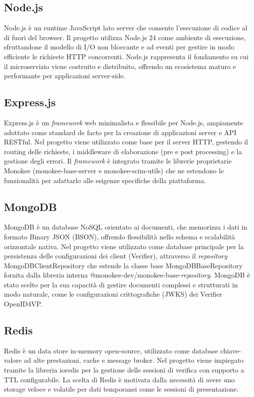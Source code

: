 \subsection{Node.js}

Node.js è un runtime JavaScript lato server che consente l'esecuzione di codice al di fuori del browser. Il progetto utilizza Node.js 24 come ambiente di esecuzione, sfruttandone il modello di I/O non bloccante e ad eventi per gestire in modo efficiente le richieste HTTP\glsfirstoccur{} concorrenti. Node.js rappresenta il fondamento su cui il microservizio viene costruito e distribuito, offrendo un ecosistema maturo e performante per applicazioni server-side.

\subsection{Express.js}
Express.js è un \textit{framework} web minimalista e flessibile per Node.js, ampiamente adottato come standard de facto per la creazione di applicazioni server e API\glsfirstoccur{} RESTful. Nel progetto viene utilizzato come base per il server HTTP, gestendo il routing delle richieste, i middleware di elaborazione (pre e post processing) e la gestione degli errori. Il \textit{framework} è integrato tramite le librerie proprietarie Monokee (monokee-base-server e monokee-scim-utils) che ne estendono le funzionalità per adattarlo alle esigenze specifiche della piattaforma.

\subsection{MongoDB}
MongoDB è un database NoSQL orientato ai documenti, che memorizza i dati in formato Binary JSON (BSON\glsfirstoccur{}), offrendo flessibilità nello schema e scalabilità orizzontale nativa. Nel progetto viene utilizzato come database principale per la persistenza delle configurazioni dei client (Verifier), attraverso il \textit{repository} MongoDBClientRepository che estende la classe base MongoDBBaseRepository fornita dalla libreria interna @monokee-dev/monokee-base-\textit{repository}. MongoDB è stato scelto per la sua capacità di gestire documenti complessi e strutturati in modo naturale, come le configurazioni crittografiche (JWKS\glsfirstoccur{}) dei Verifier OpenID4VP.

\subsection{Redis}
Redis è un data store in-memory open-source, utilizzato come database chiave-valore ad alte prestazioni, cache e message broker. Nel progetto viene impiegato tramite la libreria ioredis per la gestione delle sessioni di verifica con supporto a TTL\glsfirstoccur{} configurabile. La scelta di Redis è motivata dalla necessità di avere uno storage veloce e volatile per dati temporanei come le sessioni di presentazione.

